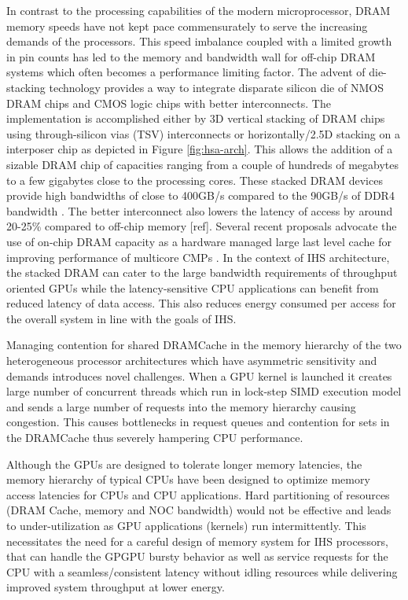 \par In contrast to the processing capabilities of the modern microprocessor, DRAM memory speeds have not kept pace commensurately to serve the increasing demands of the processors. This speed imbalance coupled with a limited growth in pin counts has led to the memory and bandwidth wall \cite{memory-wall,bandwidth-wall} for off-chip DRAM systems which often becomes a performance limiting factor. The advent of die-stacking technology \cite{3d-stacking} provides a way to integrate disparate silicon die of NMOS DRAM chips and CMOS logic chips with better interconnects. The implementation is accomplished either by 3D vertical stacking of DRAM chips using through-silicon vias (TSV) interconnects or horizontally/2.5D stacking on a interposer chip as depicted in Figure \ref{fig:hsa-arch}. This allows the addition of a sizable DRAM chip of capacities ranging from a couple of hundreds of megabytes to a few gigabytes close to the processing cores. These stacked DRAM devices provide high bandwidths of close to 400GB/s compared to the 90GB/s of DDR4 bandwidth \cite{xeonphi}. The better interconnect also lowers the latency of access by around 20-25\% compared to off-chip memory [ref]. Several recent proposals advocate the use of on-chip DRAM capacity as a hardware managed large last level cache for improving performance of multicore CMPs \cite{alloy,bimodal,loh-hill,atcache}. In the context of IHS architecture, the stacked DRAM can cater to the large bandwidth requirements of throughput oriented GPUs while the latency-sensitive CPU applications can benefit from reduced latency of data access. This also reduces energy consumed per access for the overall system in line with the goals of IHS.
\par Managing contention for shared DRAMCache in the memory hierarchy of the two heterogeneous processor architectures which have asymmetric sensitivity and demands introduces novel challenges. When a GPU kernel is launched it creates large number of concurrent threads which run in lock-step SIMD execution model and sends a large number of requests into the memory hierarchy causing congestion. This causes bottlenecks in request queues and contention for sets in the DRAMCache thus severely hampering CPU performance. 

Although the GPUs are designed to tolerate longer memory latencies, the memory hierarchy of typical CPUs have been designed to optimize memory access latencies for CPUs and CPU applications.
Hard partitioning of resources (DRAM Cache, memory and NOC bandwidth) would not be effective and leads to under-utilization as GPU applications (kernels) run intermittently. 
This necessitates the need for a careful design of memory system for IHS processors, that can handle the GPGPU bursty behavior as well as service requests for the CPU with a seamless/consistent latency without idling resources while delivering improved system throughput at lower energy.

